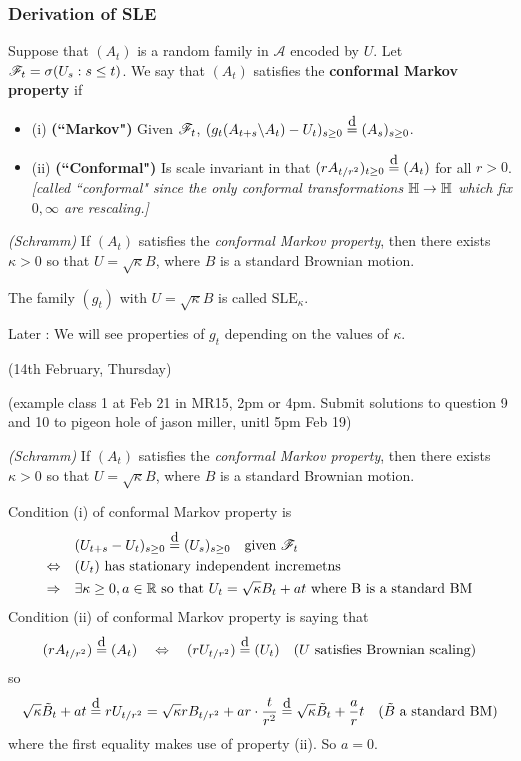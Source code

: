 \documentclass[12pt,a4paper]{article}
\newcommand\xeq{\stackrel{\mathclap{\normalfont\mbox{d}}}{=}}
\newenvironment{proof}
{\begin{changemargin}{0.5cm}{0.5cm} 
	}%
	{\end{changemargin}
}
\renewenvironment{i}
{\begin{itemize} 
	}%
	{\end{itemize}
}
\newenvironment{p}
{\begin{proof} 
	}%
	{\end{proof}
}
\begin{document}
\subsubsection*{Derivation of SLE}

 Suppose that $(A_t)$ is a random family in $\mathscr{A}$ encoded by $U$. Let $\mathscr{F}_t = \sigma(U_s : s\leq t)$. We say that $(A_t)$ satisfies the \textbf{conformal Markov property} if
\begin{i}
\item[(i)] \textbf{(``Markov")} Given $\mathscr{F}_t$, $(g_t(A_{t+s}\backslash A_t) - U_t)_{s\geq 0} \xeq (A_s)_{s\geq 0}$.
\item[(ii)] \textbf{(``Conformal")} Is scale invariant in that $(rA_{t/r^2})_{t\geq 0} \xeq (A_t)$ for all $r>0$. \emph{[called ``conformal" since the only conformal transformations $\mathbb{H}\rightarrow \mathbb{H}$ which fix $0, \infty$ are rescaling.]} 
\end{i}
\s

\thm \emph{(Schramm)} If $(A_t)$ satisfies the \emph{conformal Markov property}, then there exists $\kappa >0$ so that $U = \sqrt{\kappa} B$, where $B$ is a standard Brownian motion.
\s

 The family $(g_t)$ with $U =\sqrt{\kappa} B$ is called $\text{SLE}_{\kappa}$.

Later : We will see properties of $g_t$ depending on the values of $\kappa$.
\s

\newday

(14th February, Thursday)
\s

(example class 1 at Feb 21 in MR15, 2pm or 4pm. Submit solutions to question 9 and 10 to pigeon hole of jason miller, unitl 5pm Feb 19)
\s

\thm \emph{(Schramm)} If $(A_t)$ satisfies the \emph{conformal Markov property}, then there exists $\kappa >0$ so that $U = \sqrt{\kappa} B$, where $B$ is a standard Brownian motion.
\begin{p}
\pf Condition (i) of conformal Markov property is
\begin{align*}
& (U_{t+s} -U_t)_{s\geq 0} \xeq (U_s)_{s\geq 0} \quad \text{given } \FF_t \\
\Leftrightarrow \quad & (U_t) \text{ has stationary independent incremetns} \\
\Rightarrow \quad &\exists \kappa \geq 0, a\in \reals \text{ so that } U_t = \sqrt{\kappa} B_t + at \text{ where B is a standard BM}
\end{align*}
Condition (ii) of conformal Markov property is saying that 
\begin{align*}
(rA_{t/r^2}) \xeq (A_t) \quad \Leftrightarrow \quad (rU_{t/r^2}) \xeq (U_t) \quad (U \text{ satisfies Brownian scaling)}
\end{align*}
so
\begin{align*}
\sqrt{\kappa} \tilde{B}_t + at \xeq rU_{t/r^2} =  \sqrt{\kappa} rB_{t/r^2} + ar\cdot \frac{t}{r^2} \xeq  \sqrt{\kappa} \tilde{B}_t + \frac{a}{r}{t} \quad (\tilde{B} \text{ a standard BM}) 
\end{align*}
where the first equality makes use of property (ii). So $a=0$.

\eop
\end{p}
\s
\end{document}
